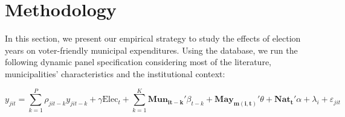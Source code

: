 \section{Methodology}

In this section, we present our empirical strategy to study the effects of election years on voter-friendly municipal expenditures. Using the database, we run the following dynamic panel specification considering most of the literature, municipalities' characteristics and the institutional context: 

\begin{equation}\label{eq:main_specification}
	y_{jit} = \sum_{k=1}^{P} \rho_{jit-k} y_{jit-k} + \gamma \text{Elec}_t + \sum_{k=1}^{K} \mathbf{Mun_{it-k}'}\beta_{t-k} + \mathbf{May_{m(i,t)}'}\theta + \mathbf{Nat_{t}'}\alpha + \lambda_i + \varepsilon_{jit}
\end{equation}

